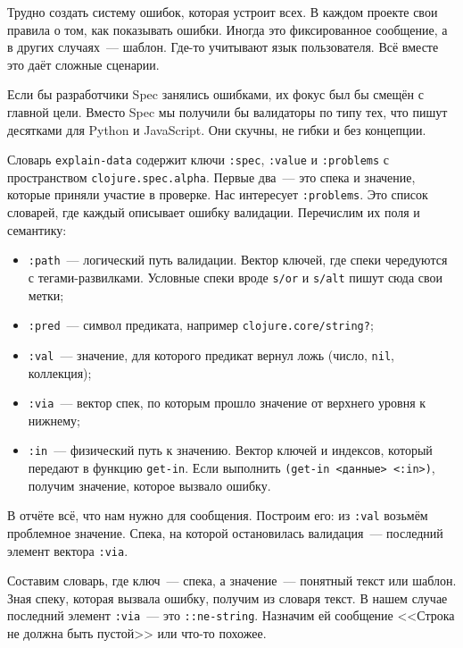 Трудно создать систему ошибок, которая устроит всех. В каждом проекте свои
правила о том, как показывать ошибки. Иногда это фиксированное сообщение, а в
других случаях~--- шаблон. Где-то учитывают язык пользователя. Всё вместе это
даёт сложные сценарии.

Если бы разработчики Spec занялись ошибками, их фокус был бы смещён с главной
цели. Вместо Spec мы получили бы валидаторы по типу тех, что пишут десятками для
Python и JavaScript. Они скучны, не гибки и без концепции.

Словарь \verb|explain-data| содержит ключи \verb|:spec|, \verb|:value| и
\verb|:problems| с пространством \verb|clojure.spec.alpha|. Первые два~--- это
спека и значение, которые приняли участие в проверке. Нас интересует
\verb|:problems|. Это список словарей, где каждый описывает ошибку
валидации. Перечислим их поля и семантику:


\begin{itemize}

\item
  \verb|:path|~--- логический путь валидации. Вектор ключей, где спеки
  чередуются с тегами-развилками. Условные спеки вроде \verb|s/or| и
  \verb|s/alt| пишут сюда свои метки;

\item
  \verb|:pred|~--- символ предиката, например \texttt{clo\-ju\-re.\-core/\-string?};

\item
  \verb|:val|~--- значение, для которого предикат вернул ложь (число,
  \verb|nil|, коллекция);

\item
  \verb|:via|~--- вектор спек, по которым прошло значение от верхнего уровня к
  нижнему;

\item
  \verb|:in|~--- физический путь к значению. Вектор ключей и индексов, который
  передают в функцию \verb|get-in|. Если выполнить \verb|(get-in <данные> <:in>)|,
  получим значение, которое вызвало ошибку.

\end{itemize}

В отчёте всё, что нам нужно для сообщения. Построим его: из \verb|:val| возьмём
проблемное значение. Спека, на которой остановилась валидация~--- последний
элемент вектора \verb|:via|.

Составим словарь, где ключ~--- спека, а значение~--- понятный текст или
шаблон. Зная спеку, которая вызвала ошибку, получим из словаря текст. В нашем
случае последний элемент \verb|:via|~--- это \verb|::ne-string|. Назначим ей
сообщение <<Строка не должна быть пустой>> или что-то похожее.

